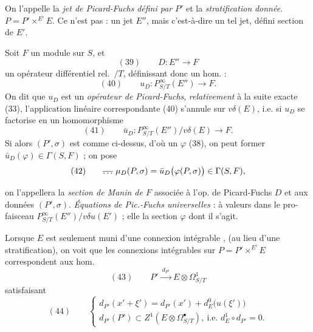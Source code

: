 \documentclass[11pt,a4paper]{article}
\begin{document}
On l'appelle la  \emph{jet de Picard-Fuchs}
\emph{défini par} $P'$ \struck{\ill{}} et la \emph{stratification} \add{$\sigma$} \emph{donnée}.
\struck{\ill{}} $P = P' \times^{E'} E$. Ce n'est pas  :  un
jet   $E''$, mais  \ill{}  \ill{} 
c'est-à-dire un tel jet, défini  \struck{\ill{}}  
section de \struck{\ill{}} $E'$.

Soit $F$ un module  sur  $S$, et
\[
(39)\qquad D : E'' \longrightarrow F
\]
un opérateur différentiel  rel.~$/T$, définissant donc un
hom.  \struck{\ill{}} : \struck{\ill{}}
\[
(40)\qquad u_D : P^\infty_{S/T}(E'') \longrightarrow F .
\]
On dit que $u_D$  est un \emph{opérateur de Picard-Fuchs}, \emph{relativement} à la suite exacte
(33),  l'application linéaire correspondante
(40) s'annule sur $v\delta(E)$, i.e. si $u_D$ se
factorise en un homomorphisme
\[
(41)\qquad \bar u_D : P^\infty_{S/T}(E'')/v\delta(E) \longrightarrow F .
\]
 Si alors $(P',\sigma)$ est comme
ci-dessus, d'où un $\varphi$ (38), on peut
former $\bar u_D(\varphi) \in \Gamma(S,F)$ ; on pose
\[
(42)\qquad \text{\struck{$\ldots$}}\ \mu_D(P,\sigma) = \bar u_D\bigl(\varphi(P,\sigma)\bigr) \in \Gamma(S,F) ,
\]

on l'appellera la \emph{section de Manin de $F$} associée
à l'op. de Picard-Fuchs $D$ et aux données $(P',\sigma)$.
\emph{Équations de Pic.-Fuchs universelles} : à valeurs dans le pro-faisceau
$P^\infty_{S/T}(E'')/v\delta u(E')$ ; elle  la section $\varphi$ dont il s'agit.

Lorsque $E$ est seulement muni d'une connexion
intégrable , \struck{\ill{}} (au lieu d'une stratification), on voit
que les connexions intégrables sur $P = P' \times^{E'} E$
correspondent aux hom.
\[
(43)\qquad P' \xrightarrow{\ d_{P'}\ } E \otimes \Omega^1_{S/T}
\]
satisfaisant
\[
(44)\qquad
\begin{cases}
d_{P'}(x' + \xi') = d_{P'}(x') + d^0_E\bigl(u(\xi')\bigr) \\
d_{P'}(P') \subset Z^1(E \otimes \Omega^\bullet_{S/T}) , \ \text{i.e. } d^1_E \circ d_{P'} = 0 .
\end{cases}
\]
\end{document}
